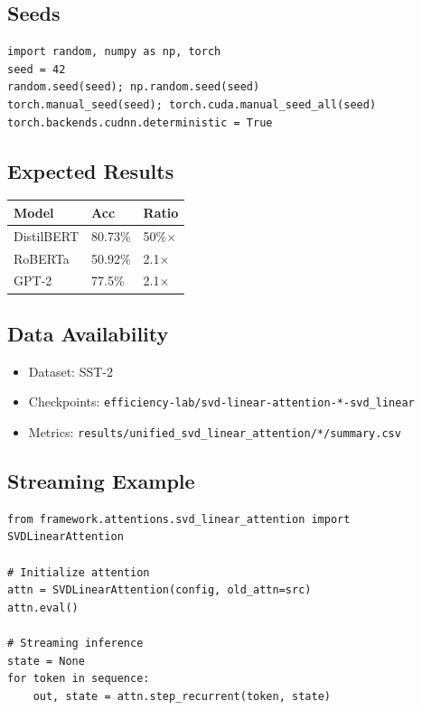 \subsection{Seeds}

\begin{lstlisting}
import random, numpy as np, torch
seed = 42
random.seed(seed); np.random.seed(seed)
torch.manual_seed(seed); torch.cuda.manual_seed_all(seed)
torch.backends.cudnn.deterministic = True
\end{lstlisting}

\subsection{Expected Results}

\begin{table}[H]
\centering
\small
\begin{tabular}{lll}
\toprule
\textbf{Model} & \textbf{Acc} & \textbf{Ratio} \\
\midrule
DistilBERT & 80.73\% & 50\%$\times$ \\
RoBERTa & 50.92\% & 2.1$\times$ \\
GPT-2 & 77.5\% & 2.1$\times$ \\
\bottomrule
\end{tabular}
\end{table}

\subsection{Data Availability}

\begin{itemize}
\item Dataset: SST-2
\item Checkpoints: \texttt{efficiency-lab/svd-linear-attention-*-svd\_linear}
\item Metrics: \texttt{results/unified\_svd\_linear\_attention/*/summary.csv}

\end{itemize}
\subsection{Streaming Example}

\begin{lstlisting}
from framework.attentions.svd_linear_attention import SVDLinearAttention

# Initialize attention
attn = SVDLinearAttention(config, old_attn=src)
attn.eval()

# Streaming inference
state = None
for token in sequence:
    out, state = attn.step_recurrent(token, state)
\end{lstlisting}

